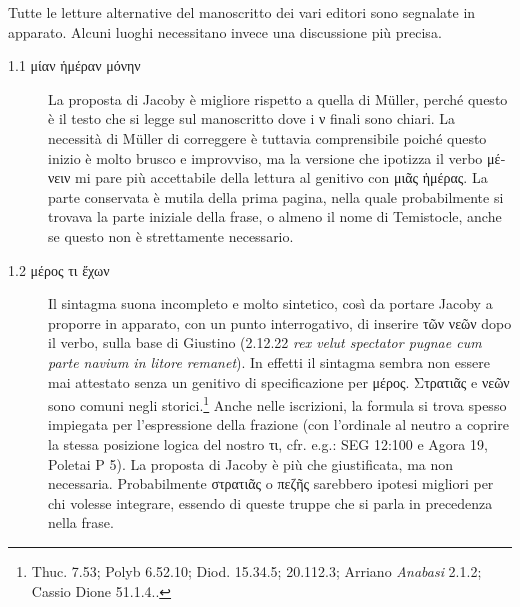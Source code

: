 Tutte le letture alternative del manoscritto dei vari editori sono segnalate in apparato. Alcuni luoghi necessitano invece una discussione più precisa.
\begin{description}
\item[1.1 \textgreek{μίαν ἡμέραν μόνην}] La proposta di Jacoby è migliore rispetto a quella di Müller, perché questo è il testo che si legge sul manoscritto dove i \textgreek{ν} finali sono chiari. La necessità di Müller di correggere è tuttavia comprensibile poiché questo inizio è molto brusco e improvviso, ma la versione che ipotizza il verbo \textgreek{μένειν} mi pare più accettabile della lettura al genitivo con \textgreek{μιᾶς ἡμέρας}. La parte conservata è mutila della prima pagina, nella quale probabilmente si trovava la parte iniziale della frase, o almeno il nome di Temistocle, anche se questo non è strettamente necessario. 
\item[1.2 \textgreek{μέρος τι ἔχων}] Il sintagma suona incompleto e molto sintetico, così da portare Jacoby a proporre in apparato, con un punto interrogativo, di inserire \textgreek{τῶν νεῶν} dopo il verbo, sulla base di Giustino (2.12.22 \textit{rex velut spectator pugnae cum parte navium in litore remanet}). In effetti il sintagma sembra non essere mai attestato senza un genitivo di specificazione per \textgreek{μέρος}.\textgreek{ Στρατιᾶς} e \textgreek{νεῶν} sono comuni negli storici.\footnote{Thuc. 7.53; Polyb 6.52.10; Diod. 15.34.5; 20.112.3;  Arriano \emph{Anabasi} 2.1.2; Cassio Dione 51.1.4..} Anche nelle iscrizioni, la formula si trova spesso impiegata per l'espressione della frazione (con l'ordinale al neutro a coprire la stessa posizione logica del nostro \textgreek{τι}, cfr. e.g.: SEG 12:100 e Agora 19, Poletai P 5). La proposta di Jacoby è più che giustificata, ma non necessaria. Probabilmente \textgreek{στρατιᾶς} o \textgreek{πεζῆς} sarebbero ipotesi migliori per chi volesse integrare, essendo di queste truppe che si parla in precedenza nella frase.

\end{description}
